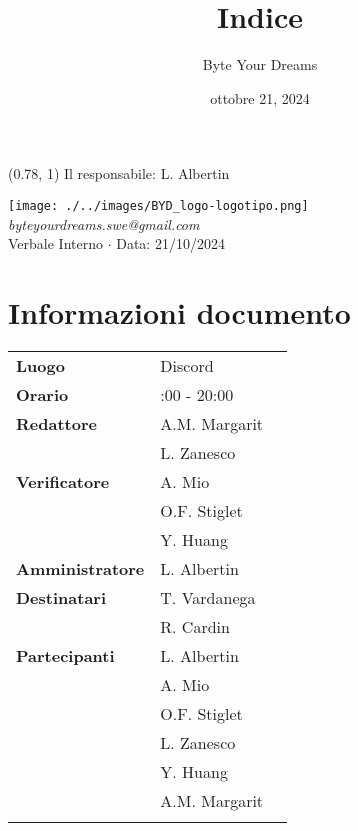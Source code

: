 \documentclass{article}
\title{\textbf{\fontsize{28}{6}\selectfont Indice}}
\author{\fontsize{14}{6}\selectfont Byte Your Dreams}
\date{ottobre 21, 2024}
\begin{document}
\begin{textblock*}{\textwidth}(0.78\textwidth, 1\textheight)
    Il responsabile: L. Albertin\\
    
\end{textblock*}
\pagestyle{fancy}
\begin{center}
\texttt{[image: ./../images/BYD\_logo-logotipo.png]} \\
\fontsize{12}{6}\textcolor[RGB]{60, 60, 60}{\textit{byteyourdreams.swe@gmail.com}} \\
\vspace{0.5cm}
\fontsize{16}{6}\selectfont Verbale Interno $\cdot$ Data: 21/10/2024 \\
\vspace{0.5cm}
\end{center}




\section*{Informazioni documento}
\def\arraystretch{1.2}
\begin{tabular}{>{\raggedleft\arraybackslash}p{}|>{\raggedright\arraybackslash}p{}c}
\hline
\addlinespace
\textbf{Luogo} & Discord \vspace{10pt} \\
\textbf{Orario} & 18:00 - 20:00 \vspace{10pt} \\
\textbf{Redattore} & A.M. Margarit \\ & L. Zanesco \vspace{10pt} \\
\textbf{Verificatore} & A. Mio \\ & O.F. Stiglet \\ & Y. Huang \vspace{10pt} \\
\textbf{Amministratore} & L. Albertin \vspace{10pt} \\
\textbf{Destinatari} & T. Vardanega \\ & R. Cardin \vspace{10pt} \\
\textbf{Partecipanti} & L. Albertin \\ & A. Mio \\ & O.F. Stiglet \\ & L. Zanesco \\ & Y. Huang\\ & A.M. Margarit \\\vspace{10pt} \\
\end{tabular}
\end{document}
